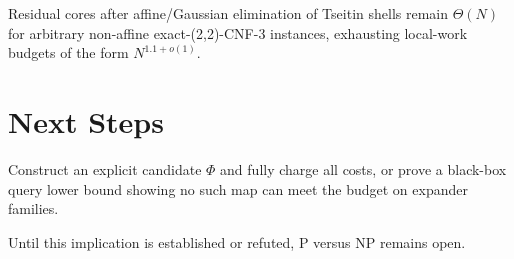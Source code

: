 \documentclass[11pt]{article}
\begin{document}
Residual cores after affine/Gaussian elimination of Tseitin shells remain \(\Theta(N)\) for arbitrary non-affine exact-(2,2)-CNF-3 instances, exhausting local-work budgets of the form \(N^{1.1+o(1)}\).

\section{Next Steps}
Construct an explicit candidate \(\Phi\) and fully charge all costs, or prove a black-box query lower bound showing no such map can meet the budget on expander families.

Until this implication is established or refuted, P versus NP remains open.
\end{document}
